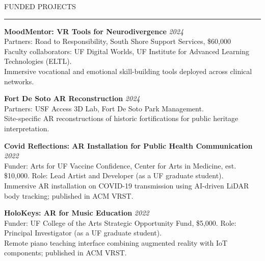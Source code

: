\documentclass{resume} %
\renewenvironment{rSection}[1]{
  \needspace{4\baselineskip}
  \sectionskip
  \textcolor{CustomRed}{\MakeUppercase{#1}}
  \sectionlineskip
  \hrule
  \begin{list}{}{
    \setlength{\leftmargin}{1.5em}
  }
  \item[]
}{
  \end{list}
}
\begin{document}
\begin{rSection}{Funded Projects}
\textbf{MoodMentor: VR Tools for Neurodivergence} \hfill \emph{2024}\\
Partners: Road to Responsibility, South Shore Support Services, \$60,000\\
Faculty collaborators: UF Digital Worlds, UF Institute for Advanced Learning Technologies (ELTL).\\
Immersive vocational and emotional skill-building tools deployed across clinical networks.

\textbf{Fort De Soto AR Reconstruction} \hfill \emph{2024}\\
Partners: USF Access 3D Lab, Fort De Soto Park Management.\\
Site-specific AR reconstructions of historic fortifications for public heritage interpretation.

\textbf{Covid Reflections: AR Installation for Public Health Communication} \hfill \emph{2022}\\
Funder: Arts for UF Vaccine Confidence, Center for Arts in Medicine, est. \$10,000. Role: Lead Artist and Developer (as a UF graduate student).\\
Immersive AR installation on COVID-19 transmission using AI-driven LiDAR body tracking; published in ACM VRST.

\textbf{HoloKeys: AR for Music Education} \hfill \emph{2022}\\
Funder: UF College of the Arts Strategic Opportunity Fund, \$5,000. Role: Principal Investigator (as a UF graduate student).\\
Remote piano teaching interface combining augmented reality with IoT components; published in ACM VRST.
\end{rSection}
\end{document}

